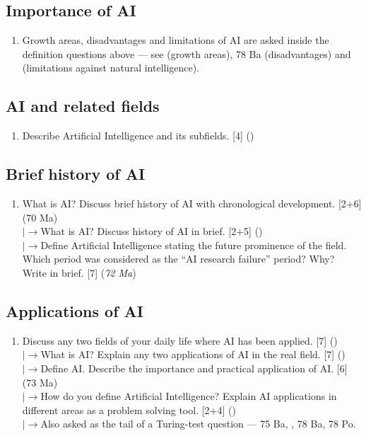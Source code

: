 \documentclass[12pt]{article}
\newcommand{\lb}{\\$\left|\rightarrow\right.$}
\begin{document}
  \subsection{Importance of AI}
    \begin{enumerate}[topsep=0pt, noitemsep]
      \item Growth areas, disadvantages and limitations of AI are asked inside the definition questions above --- see  (growth areas), 78 Ba (disadvantages) and  (limitations against natural intelligence).
    \end{enumerate}

  \subsection{AI and related fields}
    \begin{enumerate}[topsep=0pt, noitemsep]
      \item Describe Artificial Intelligence and its subfields. \hfill [4] ()
    \end{enumerate}

  \subsection{Brief history of AI}
    \begin{enumerate}[topsep=0pt, noitemsep]
      \item What is AI? Discuss brief history of AI with chronological development. \hfill [2+6] (70 Ma)
        \lb What is AI? Discuss history of AI in brief. \hfill [2+5] ()
        \lb Define Artificial Intelligence stating the future prominence of the field. Which period was considered as the ``AI research failure'' period? Why? Write in brief. \hfill [7] (\textit{72 Ma})
    \end{enumerate}

  \subsection{Applications of AI}
    \begin{enumerate}[topsep=0pt, noitemsep]
      \item Discuss any two fields of your daily life where AI has been applied. \hfill [7] ()
        \lb What is AI? Explain any two applications of AI in the real field. \hfill [7] ()
        \lb Define AI. Describe the importance and practical application of AI. \hfill [6] (73 Ma)
        \lb How do you define Artificial Intelligence? Explain AI applications in different areas as a problem solving tool. \hfill [2+4] ()
        \lb Also asked as the tail of a Turing-test question --- 75 Ba, , 78 Ba, 78 Po.
    \end{enumerate}
\end{document}
